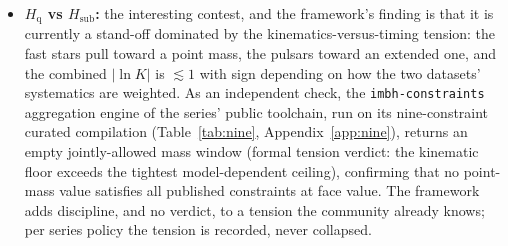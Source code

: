 \documentclass[11pt]{article}
\newcommand{\lnK}{\ensuremath{\ln K}}
\newcommand{\Hgas}{\ensuremath{H_{\mathrm{q}}}}
\newcommand{\Hsub}{\ensuremath{H_{\mathrm{sub}}}}
\begin{document}
\begin{itemize}
\item \textbf{\Hgas{} vs \Hsub:} the interesting contest, and the framework's finding is that it is currently a stand-off dominated by the kinematics-versus-timing tension: the fast stars pull toward a point mass, the pulsars toward an extended one, and the combined $|\lnK|$ is $\lesssim 1$ with sign depending on how the two datasets' systematics are weighted. As an independent check, the \texttt{imbh-constraints} aggregation engine of the series' public toolchain, run on its nine-constraint curated compilation (Table~\ref{tab:nine}, Appendix~\ref{app:nine}), returns an empty jointly-allowed mass window (formal tension verdict: the kinematic floor exceeds the tightest model-dependent ceiling), confirming that no point-mass value satisfies all published constraints at face value. The framework adds discipline, and no verdict, to a tension the community already knows; per series policy the tension is recorded, never collapsed.

\end{itemize}
\end{document}
